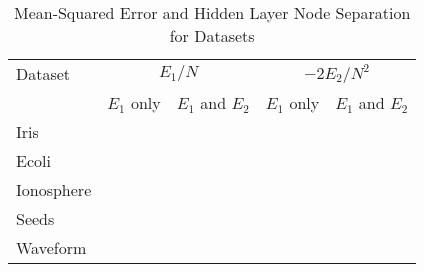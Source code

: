 \begin{table}[t]
  \centering
  \small
  \begin{tabular}{|l|r|r|r|r|}
    \hline
    Dataset & 
    \multicolumn{2}{c|}{$E_1/N$} & 
    \multicolumn{2}{c|}{$-2E_2/N^2$} \\
    \cline{2-5}
    & $E_1$ only & $E_1$ and $E_2$ & $E_1$ only & $E_1$ and $E_2$ \\
    \hline
    Iris & & & & \\
    Ecoli & & & & \\
    Ionosphere & & & & \\
    Seeds & & & & \\
    Waveform & & & & \\
    \hline
  \end{tabular}
  \caption{Mean-Squared Error and Hidden Layer Node Separation for Datasets }
  \label{tab:e1_e2_avgs}  
\end{table}

